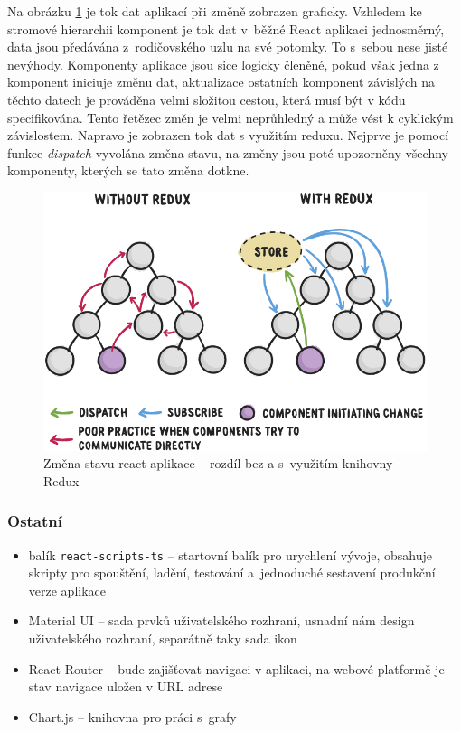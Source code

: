 Na obrázku \ref{reared} je tok dat aplikací při změně zobrazen graficky. Vzhledem ke stromové hierarchii komponent je tok dat v~běžné React aplikaci jednosměrný, data jsou předávána z~rodičovského uzlu na své potomky. To s~sebou nese jisté nevýhody. Komponenty aplikace jsou sice logicky členěné, pokud však jedna z komponent iniciuje změnu dat, aktualizace ostatních komponent závislých na těchto datech je prováděna velmi složitou cestou, která musí být v kódu specifikována. Tento řetězec změn je velmi neprůhledný a může vést k cyklickým závislostem. Napravo je zobrazen tok dat s využitím reduxu. Nejprve je pomocí funkce \textit{dispatch} vyvolána změna stavu, na změny jsou poté upozorněny všechny komponenty, kterých se tato změna dotkne.


\begin{figure}
  \centering
  \includegraphics[width=14cm]{img/reactredux.png}
  \caption{Změna stavu react aplikace -- rozdíl bez a s~využitím knihovny Redux \cite{redux}}
  \label{reared}
\end{figure}


\subsubsection{Ostatní}
\begin{itemize}
	\item balík \texttt{react-scripts-ts} -- startovní balík pro urychlení vývoje, obsahuje skripty pro spouštění, ladění, testování a~jednoduché sestavení produkční verze aplikace
	\item Material UI -- sada prvků uživatelského rozhraní, usnadní nám design uživatelského rozhraní, separátně taky sada ikon
  \item React Router -- bude zajišťovat navigaci v aplikaci, na webové platformě je stav navigace uložen v URL adrese
	\item Chart.js -- knihovna pro práci s~grafy
\end{itemize} 






